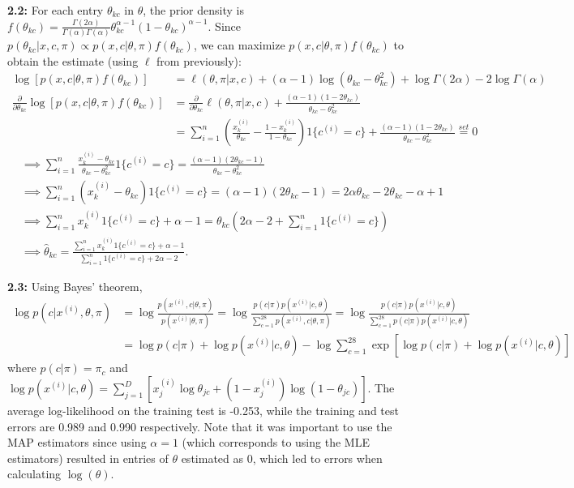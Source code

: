 \documentclass[12pt]{article}
\begin{document}
\textbf{2.2:} For each entry $\theta_{kc}$ in $\theta$, the prior density is $f(\theta_{kc}) = \frac{\Gamma(2\alpha)}{\Gamma(\alpha)\Gamma(\alpha)}\theta_{kc}^{\alpha-1}(1-\theta_{kc})^{\alpha-1}$. Since $p(\theta_{kc}|x,c,\pi) \propto p(x,c|\theta,\pi)f(\theta_{kc})$, we can maximize $p(x,c|\theta,\pi)f(\theta_{kc})$ to obtain the estimate (using $\ell$ from previously): \begin{align*}
    \log[p(x,c|\theta,\pi)f(\theta_{kc})] &= \ell(\theta,\pi|x,c)+(\alpha-1)\log(\theta_{kc}-\theta_{kc}^2)+\log\Gamma(2\alpha)-2\log\Gamma(\alpha)\\
    \frac{\partial}{\partial\theta_{kc}}\log[p(x,c|\theta,\pi)f(\theta_{kc})] &= \frac{\partial}{\partial\theta_{kc}}\ell(\theta,\pi|x,c) + \frac{(\alpha-1)(1-2\theta_{kc})}{\theta_{kc}-\theta_{kc}^2}\\
    &= \sum_{i=1}^n(\frac{x_k^{(i)}}{\theta_{kc}}-\frac{1-x_k^{(i)}}{1-\theta_{kc}})1\{c^{(i)}=c\} + \frac{(\alpha-1)(1-2\theta_{kc})}{\theta_{kc}-\theta_{kc}^2} \overset{set}{=} 0
\end{align*}\begin{align*}
    &\implies \sum_{i=1}^n\frac{x_k^{(i)}-\theta_{kc}}{\theta_{kc}-\theta_{kc}^2}1\{c^{(i)}=c\} = \frac{(\alpha-1)(2\theta_{kc}-1)}{\theta_{kc}-\theta_{kc}^2}\\
    &\implies \sum_{i=1}^n(x_k^{(i)}-\theta_{kc})1\{c^{(i)}=c\} = (\alpha-1)(2\theta_{kc}-1) = 2\alpha\theta_{kc}-2\theta_{kc}-\alpha+1\\
    &\implies \sum_{i=1}^n x_k^{(i)}1\{c^{(i)}=c\}+\alpha-1 = \theta_{kc}(2\alpha-2+\sum_{i=1}^n 1\{c^{(i)}=c\})\\
    &\implies \hat\theta_{kc} = \frac{\sum_{i=1}^n x_k^{(i)}1\{c^{(i)}=c\}+\alpha-1}{\sum_{i=1}^n 1\{c^{(i)}=c\}+2\alpha-2}.
\end{align*}

\textbf{2.3:} Using Bayes' theorem, \begin{align*}
    \log p(c|x^{(i)},\theta,\pi) &= \log\frac{p(x^{(i)},c|\theta,\pi)}{p(x^{(i)}|\theta,\pi)} = \log\frac{p(c|\pi)p(x^{(i)}|c,\theta)}{\sum_{c=1}^{28}p(x^{(i)},c|\theta,\pi)} = \log\frac{p(c|\pi)p(x^{(i)}|c,\theta)}{\sum_{c=1}^{28}p(c|\pi)p(x^{(i)}|c,\theta)}\\
    &= \log p(c|\pi) + \log p(x^{(i)}|c,\theta) - \log\sum_{c=1}^{28}\exp[\log p(c|\pi) + \log p(x^{(i)}|c,\theta)]
\end{align*} where $p(c|\pi)=\pi_c$ and $\log p(x^{(i)}|c,\theta)=\sum_{j=1}^D [x_j^{(i)}\log\theta_{jc}+(1-x_j^{(i)})\log(1-\theta_{jc})]$. The average log-likelihood on the training test is -0.253, while the training and test errors are 0.989 and 0.990 respectively. Note that it was important to use the MAP estimators since using $\alpha=1$ (which corresponds to using the MLE estimators) resulted in entries of $\theta$ estimated as 0, which led to errors when calculating $\log(\theta)$.
\end{document}
